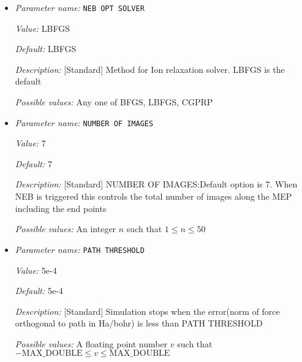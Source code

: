 \begin{itemize}
{\it Description:} [Standard] Atomic-coordinates input file name. For fully non-periodic domain give Cartesian coordinates of the atoms (in a.u) with respect to origin at the center of the domain. For periodic and semi-periodic domain give fractional coordinates of atoms. File format (example for two atoms): Atom1-atomic-charge Atom1-valence-charge x1 y1 z1 (row1), Atom2-atomic-charge Atom2-valence-charge x2 y2 z2 (row2). The number of rows must be equal to NATOMS, and number of unique atoms must be equal to NATOM TYPES.


{\it Possible values:} Any string
\item {\it Parameter name:} {\tt NEB OPT SOLVER}
\label{parameters:NEB/NEB OPT SOLVER}
\label{parameters:NEB/NEB_20OPT_20SOLVER}


{\it Value:} LBFGS


{\it Default:} LBFGS


{\it Description:} [Standard] Method for Ion relaxation solver. LBFGS is the default


{\it Possible values:} Any one of BFGS, LBFGS, CGPRP
\item {\it Parameter name:} {\tt NUMBER OF IMAGES}
\label{parameters:NEB/NUMBER OF IMAGES}
\label{parameters:NEB/NUMBER_20OF_20IMAGES}


{\it Value:} 7


{\it Default:} 7


{\it Description:} [Standard] NUMBER OF IMAGES:Default option is 7. When NEB is triggered this controls the total number of images along the MEP including the end points


{\it Possible values:} An integer $n$ such that $1\leq n \leq 50$
\item {\it Parameter name:} {\tt PATH THRESHOLD}
\label{parameters:NEB/PATH THRESHOLD}
\label{parameters:NEB/PATH_20THRESHOLD}


{\it Value:} 5e-4


{\it Default:} 5e-4


{\it Description:} [Standard] Simulation stops when the error(norm of force orthogonal to path in Ha/bohr) is less than PATH THRESHOLD 


{\it Possible values:} A floating point number $v$ such that $-\text{MAX\_DOUBLE} \leq v \leq \text{MAX\_DOUBLE}$
\end{itemize}
